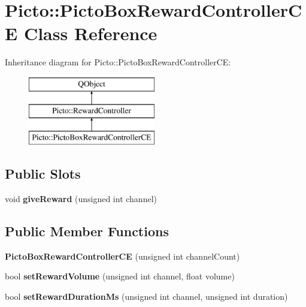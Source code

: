 \hypertarget{class_picto_1_1_picto_box_reward_controller_c_e}{\section{Picto\-:\-:Picto\-Box\-Reward\-Controller\-C\-E Class Reference}
\label{class_picto_1_1_picto_box_reward_controller_c_e}
}
Inheritance diagram for Picto\-:\-:Picto\-Box\-Reward\-Controller\-C\-E\-:\begin{figure}[H]
\begin{center}
\leavevmode
\includegraphics[height=3.000000cm]{class_picto_1_1_picto_box_reward_controller_c_e}
\end{center}
\end{figure}
\subsection*{Public Slots}
\begin{DoxyCompactItemize}
\item 
\hypertarget{class_picto_1_1_picto_box_reward_controller_c_e_a48d81bf49db57606a3931d8ddd11d56e}{void {\bfseries give\-Reward} (unsigned int channel)}\label{class_picto_1_1_picto_box_reward_controller_c_e_a48d81bf49db57606a3931d8ddd11d56e}

\end{DoxyCompactItemize}
\subsection*{Public Member Functions}
\begin{DoxyCompactItemize}
\item 
\hypertarget{class_picto_1_1_picto_box_reward_controller_c_e_a17167a2b24507e11f62577797851152b}{{\bfseries Picto\-Box\-Reward\-Controller\-C\-E} (unsigned int channel\-Count)}\label{class_picto_1_1_picto_box_reward_controller_c_e_a17167a2b24507e11f62577797851152b}

\item 
\hypertarget{class_picto_1_1_picto_box_reward_controller_c_e_a1f2503ff02d3fe4ac4ea5264b8091c89}{bool {\bfseries set\-Reward\-Volume} (unsigned int channel, float volume)}\label{class_picto_1_1_picto_box_reward_controller_c_e_a1f2503ff02d3fe4ac4ea5264b8091c89}

\item 
\hypertarget{class_picto_1_1_picto_box_reward_controller_c_e_a698cf0bf5b14098684230e31752ff6bf}{bool {\bfseries set\-Reward\-Duration\-Ms} (unsigned int channel, unsigned int duration)}\label{class_picto_1_1_picto_box_reward_controller_c_e_a698cf0bf5b14098684230e31752ff6bf}

\end{DoxyCompactItemize}
